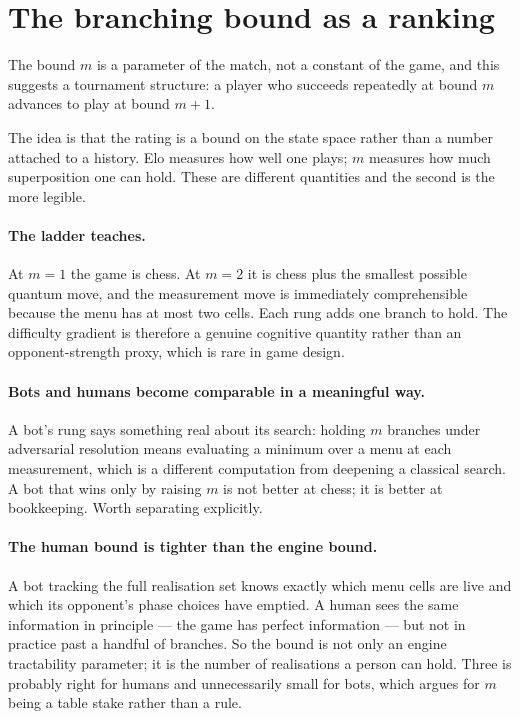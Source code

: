 \documentclass[11pt,a4paper]{article}
\theoremstyle{definition}
\theoremstyle{plain}
\begin{document}
\section{The branching bound as a ranking}
\label{sec:ladder}

The bound $m$ is a parameter of the match, not a constant of the game, and this
suggests a tournament structure: a player who succeeds repeatedly at bound $m$
advances to play at bound $m+1$.

The idea is that the rating is a bound on the state space rather than a number
attached to a history. Elo measures how well one plays; $m$ measures how much
superposition one can hold. These are different quantities and the second is
the more legible.

\paragraph{The ladder teaches.}
At $m=1$ the game is chess. At $m=2$ it is chess plus the smallest possible
quantum move, and the measurement move is immediately comprehensible because
the menu has at most two cells. Each rung adds one branch to hold. The
difficulty gradient is therefore a genuine cognitive quantity rather than an
opponent-strength proxy, which is rare in game design.

\paragraph{Bots and humans become comparable in a meaningful way.}
A bot's rung says something real about its search: holding $m$ branches under
adversarial resolution means evaluating a minimum over a menu at each
measurement, which is a different computation from deepening a classical
search. A bot that wins only by raising $m$ is not better at chess; it is
better at bookkeeping. Worth separating explicitly.

\paragraph{The human bound is tighter than the engine bound.}
A bot tracking the full realisation set knows exactly which menu cells are live
and which its opponent's phase choices have emptied. A human sees the same
information in principle --- the game has perfect information --- but not in
practice past a handful of branches. So the bound is not only an engine
tractability parameter; it is the number of realisations a person can hold.
Three is probably right for humans and unnecessarily small for bots, which
argues for $m$ being a table stake rather than a rule.
\end{document}
